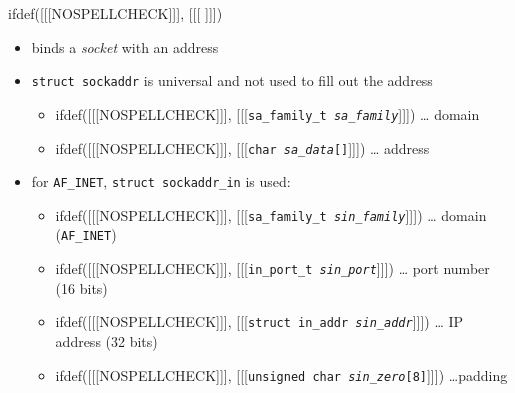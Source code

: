 \begin{slide}
ifdef([[[NOSPELLCHECK]]], [[[
]]])
\begin{itemize}
\item binds a \emph{socket} with an address
\item \texttt{struct sockaddr} is universal and not used to fill out the address
    \begin{itemize}
    \item ifdef([[[NOSPELLCHECK]]],
    [[[\texttt{sa\_family\_t \emph{sa\_family}}]]]) \dots{} domain
    \item ifdef([[[NOSPELLCHECK]]], [[[\texttt{char \emph{sa\_data}[]}]]])
     \dots{} address
    \end{itemize}
    \item for \texttt{AF\_INET}, \texttt{struct sockaddr\_in} is used:
    \begin{itemize}
    \item ifdef([[[NOSPELLCHECK]]],
    [[[\texttt{sa\_family\_t \emph{sin\_family}}]]]) \dots{} domain
    (\texttt{AF\_INET}) 
    \item ifdef([[[NOSPELLCHECK]]],
    [[[\texttt{in\_port\_t \emph{sin\_port}}]]]) \dots{} port number (16 bits) 
    \item ifdef([[[NOSPELLCHECK]]],
    [[[\texttt{struct in\_addr \emph{sin\_addr}}]]]) \dots{}
    IP address (32 bits)
    \item ifdef([[[NOSPELLCHECK]]],
    [[[\texttt{unsigned char \emph{sin\_zero}[8]}]]]) \dots padding
    \end{itemize}
\end{itemize}
\end{slide}

